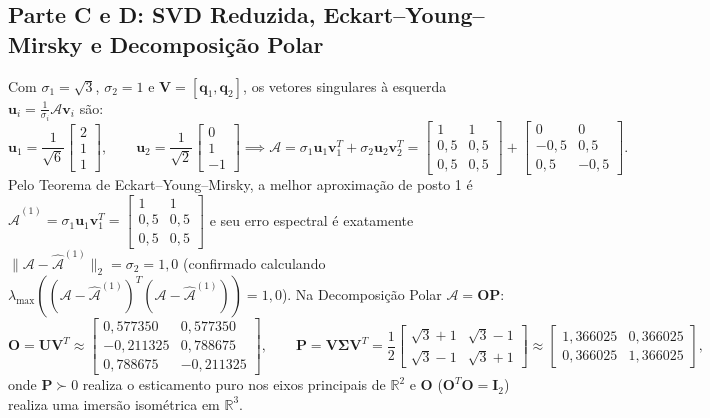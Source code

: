 \documentclass[11pt,a4paper]{article}
\begin{document}
\subsection{Parte C e D: SVD Reduzida, Eckart--Young--Mirsky e Decomposição Polar}
Com $\sigma_1 = \sqrt{3}$, $\sigma_2 = 1$ e $\mathbf{V} = [\mathbf{q}_1, \mathbf{q}_2]$, os vetores singulares à esquerda $\mathbf{u}_i = \frac{1}{\sigma_i}\mathcal{A}\mathbf{v}_i$ são:
\[
\mathbf{u}_1 = \frac{1}{\sqrt{6}}\begin{bmatrix} 2 \\ 1 \\ 1 \end{bmatrix}, \qquad \mathbf{u}_2 = \frac{1}{\sqrt{2}}\begin{bmatrix} 0 \\ 1 \\ -1 \end{bmatrix}
\implies \mathcal{A} = \sigma_1\mathbf{u}_1\mathbf{v}_1^T + \sigma_2\mathbf{u}_2\mathbf{v}_2^T = \begin{bmatrix} 1 & 1 \\ 0{,}5 & 0{,}5 \\ 0{,}5 & 0{,}5 \end{bmatrix} + \begin{bmatrix} 0 & 0 \\ -0{,}5 & 0{,}5 \\ 0{,}5 & -0{,}5 \end{bmatrix}.
\]
Pelo Teorema de Eckart--Young--Mirsky, a melhor aproximação de posto 1 é $\hat{\mathcal{A}}^{(1)} = \sigma_1\mathbf{u}_1\mathbf{v}_1^T = \begin{bmatrix} 1 & 1 \\ 0{,}5 & 0{,}5 \\ 0{,}5 & 0{,}5 \end{bmatrix}$ e seu erro espectral é exatamente $\|\mathcal{A} - \hat{\mathcal{A}}^{(1)}\|_2 = \sigma_2 = 1{,}0$ (confirmado calculando $\lambda_{\max}((\mathcal{A}-\hat{\mathcal{A}}^{(1)})^T(\mathcal{A}-\hat{\mathcal{A}}^{(1)})) = 1{,}0$). Na Decomposição Polar $\mathcal{A} = \mathbf{O}\mathbf{P}$:
\[
\mathbf{O} = \mathbf{U}\mathbf{V}^T \approx \begin{bmatrix} 0{,}577350 & 0{,}577350 \\ -0{,}211325 & 0{,}788675 \\ 0{,}788675 & -0{,}211325 \end{bmatrix}, \qquad
\mathbf{P} = \mathbf{V}\boldsymbol{\Sigma}\mathbf{V}^T = \frac{1}{2}\begin{bmatrix} \sqrt{3}+1 & \sqrt{3}-1 \\ \sqrt{3}-1 & \sqrt{3}+1 \end{bmatrix} \approx \begin{bmatrix} 1{,}366025 & 0{,}366025 \\ 0{,}366025 & 1{,}366025 \end{bmatrix},
\]
onde $\mathbf{P} \succ 0$ realiza o esticamento puro nos eixos principais de $\mathbb{R}^2$ e $\mathbf{O}$ ($\mathbf{O}^T\mathbf{O}=\mathbf{I}_2$) realiza uma imersão isométrica em $\mathbb{R}^3$.
\end{document}
